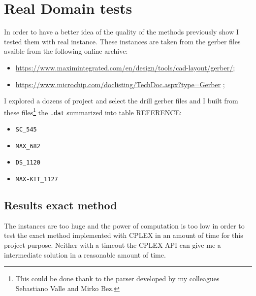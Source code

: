 \section{Real Domain tests}
\label{sec:realDomainTests}
	In order to have a better idea of the quality of the methods previously show I tested them with real instance. These instances are taken from the gerber files avaible from the following online archive:
	\begin{itemize}
		\item \href{https://www.maximintegrated.com/en/design/tools/cad-layout/gerber/}{https://www.maximintegrated.com/en/design/tools/cad-layout/gerber/};
		\item \href{https://www.microchip.com/doclisting/TechDoc.aspx?type=Gerber}{https://www.microchip.com/doclisting/TechDoc.aspx?type=Gerber} ;
	\end{itemize}

	I explored a dozens of project and select the drill gerber files and I built from these files\footnote{This could be done thank to the parser developed by my colleagues Sebastiano Valle and Mirko Bez.} the \verb|.dat| summarized into table REFERENCE:
	
	\begin{itemize}
		\item \verb|SC_545|
		\item \verb|MAX_682|
		\item \verb|DS_1120|
		\item \verb|MAX-KIT_1127|
	\end{itemize}
	
	\subsection{Results exact method}
		The instances are too huge and the power of computation is too low in order to test the exact method implemented with CPLEX in an amount of time for this project purpose. Neither with a timeout the CPLEX API can give me a intermediate solution in a reasonable amount of time.
		
		
	